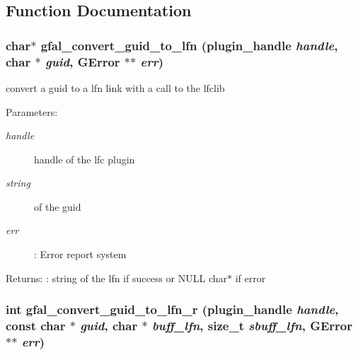 \subsection{Function Documentation}
\subsubsection{\setlength{\rightskip}{0pt plus 5cm}char$\ast$ gfal\_\-convert\_\-guid\_\-to\_\-lfn (plugin\_\-handle {\em handle}, char $\ast$ {\em guid}, GError $\ast$$\ast$ {\em err})}\label{lfc__ifce__ng_8h_4bfe1a660a34d4e1e8a5d220ee256ff5}


convert a guid to a lfn link with a call to the lfclib \begin{Desc}
\item[Parameters:]
\begin{description}
\item[{\em handle}]handle of the lfc plugin \item[{\em string}]of the guid \item[{\em err}]: Error report system \end{description}
\end{Desc}
\begin{Desc}
\item[Returns:]: string of the lfn if success or NULL char$\ast$ if error \end{Desc}
\subsubsection{\setlength{\rightskip}{0pt plus 5cm}int gfal\_\-convert\_\-guid\_\-to\_\-lfn\_\-r (plugin\_\-handle {\em handle}, const char $\ast$ {\em guid}, char $\ast$ {\em buff\_\-lfn}, size\_\-t {\em sbuff\_\-lfn}, GError $\ast$$\ast$ {\em err})}\label{lfc__ifce__ng_8h_70f8470c60821b33776b4504d6bb4610}


